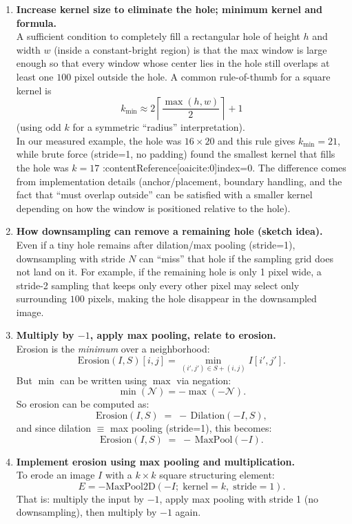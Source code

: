 \documentclass[11pt]{article}
\begin{document}
\begin{enumerate}[label=\textbf{\Alph*.}, leftmargin=1.2cm]
		\item \textbf{Increase kernel size to eliminate the hole; minimum kernel and formula.}\\
		A sufficient condition to completely fill a rectangular hole of height $h$ and width $w$ (inside a constant-bright region) is that the max window is large enough so that every window whose center lies in the hole still overlaps at least one $100$ pixel outside the hole. A common rule-of-thumb for a square kernel is
		\[
		k_{\min} \approx 2\left\lceil\frac{\max(h,w)}{2}\right\rceil + 1
		\]
		(using odd $k$ for a symmetric “radius” interpretation).\\
		In our measured example, the hole was $16\times 20$ and this rule gives $k_{\min}=21$, while brute force (stride=1, no padding) found the smallest kernel that fills the hole was $k=17$ :contentReference[oaicite:0]{index=0}. The difference comes from implementation details (anchor/placement, boundary handling, and the fact that “must overlap outside” can be satisfied with a smaller kernel depending on how the window is positioned relative to the hole).
		
		\item \textbf{How downsampling can remove a remaining hole (sketch idea).}\\
		Even if a tiny hole remains after dilation/max pooling (stride=1), downsampling with stride $N$ can “miss” that hole if the sampling grid does not land on it. For example, if the remaining hole is only 1 pixel wide, a stride-2 sampling that keeps only every other pixel may select only surrounding $100$ pixels, making the hole disappear in the downsampled image.
		
		\item \textbf{Multiply by $-1$, apply max pooling, relate to erosion.}\\
		Erosion is the \emph{minimum} over a neighborhood:
		\[
		\text{Erosion}(I,S)[i,j] = \min_{(i',j')\in S+(i,j)} I[i',j'].
		\]
		But $\min$ can be written using $\max$ via negation:
		\[
		\min(\mathcal{N}) = -\max(-\mathcal{N}).
		\]
		So erosion can be computed as:
		\[
		\text{Erosion}(I,S) \;=\; -\,\text{Dilation}(-I,S),
		\]
		and since dilation $\equiv$ max pooling (stride=1), this becomes:
		\[
		\text{Erosion}(I,S) \;=\; -\,\text{MaxPool}(-I).
		\]
		
		\item \textbf{Implement erosion using max pooling and multiplication.}\\
		To erode an image $I$ with a $k\times k$ square structuring element:
		\[
		E = -\text{MaxPool2D}(-I;\; \text{kernel}=k,\; \text{stride}=1).
		\]
		That is: multiply the input by $-1$, apply max pooling with stride 1 (no downsampling), then multiply by $-1$ again.
		
	\end{enumerate}
	
\end{document}
